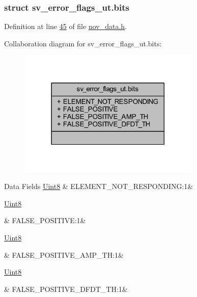 \subsubsection{struct sv\+\_\+error\+\_\+flags\+\_\+ut.\+bits}


Definition at line \hyperlink{a00022_source_l00045}{45} of file \hyperlink{a00022_source}{nov\+\_\+data.\+h}.



Collaboration diagram for sv\+\_\+error\+\_\+flags\+\_\+ut.\+bits\+:\nopagebreak
\begin{figure}[H]
\begin{center}
\leavevmode
\includegraphics[width=246pt]{dd/d24/a00981}
\end{center}
\end{figure}
\begin{DoxyFields}{Data Fields}
\hypertarget{a00022_a587be3dd1f4afa15f556d70085096e86}{\hyperlink{a00072_af84840501dec18061d18a68c162a8fa2}{Uint8}}\label{a00022_a587be3dd1f4afa15f556d70085096e86}
&
E\+L\+E\+M\+E\+N\+T\+\_\+\+N\+O\+T\+\_\+\+R\+E\+S\+P\+O\+N\+D\+I\+N\+G\+:1&
\\
\hline

\hypertarget{a00022_a19777be47fcaa9d570e4fe573d533583}{\hyperlink{a00072_af84840501dec18061d18a68c162a8fa2}{Uint8}}\label{a00022_a19777be47fcaa9d570e4fe573d533583}
&
F\+A\+L\+S\+E\+\_\+\+P\+O\+S\+I\+T\+I\+V\+E\+:1&
\\
\hline

\hypertarget{a00022_a4f8d459be1a156962f3fec7d025c7c98}{\hyperlink{a00072_af84840501dec18061d18a68c162a8fa2}{Uint8}}\label{a00022_a4f8d459be1a156962f3fec7d025c7c98}
&
F\+A\+L\+S\+E\+\_\+\+P\+O\+S\+I\+T\+I\+V\+E\+\_\+\+A\+M\+P\+\_\+\+T\+H\+:1&
\\
\hline

\hypertarget{a00022_a0c1a4805544c234baaaca401b6bba48a}{\hyperlink{a00072_af84840501dec18061d18a68c162a8fa2}{Uint8}}\label{a00022_a0c1a4805544c234baaaca401b6bba48a}
&
F\+A\+L\+S\+E\+\_\+\+P\+O\+S\+I\+T\+I\+V\+E\+\_\+\+D\+F\+D\+T\+\_\+\+T\+H\+:1&
\\
\hline

\end{DoxyFields}
\label{d4/d45/a00791}
\hypertarget{a00022_d4/d45/a00791}{}
